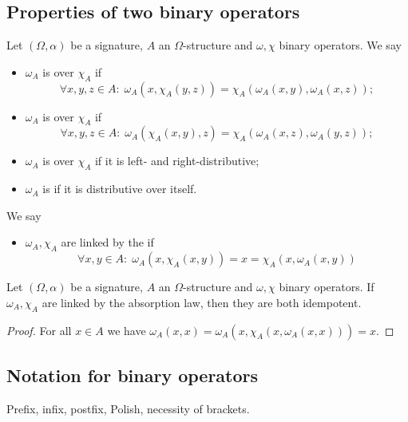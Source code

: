 \subsection{Properties of two binary operators}
\begin{definition}
Let $(\Omega, \alpha)$ be a signature, $A$ an $\Omega$-structure and $\omega, \chi$ binary operators. We say
\begin{itemize}
\item $\omega_A$ is  over $\chi_A$ if
\[ \forall x,y,z\in A: \; \omega_A(x,\chi_A(y,z)) = \chi_A(\omega_A(x,y),\omega_A(x,z)); \]
\item $\omega_A$ is  over $\chi_A$ if
\[ \forall x,y,z\in A: \; \omega_A(\chi_A(x,y), z) = \chi_A(\omega_A(x,z),\omega_A(y,z)); \]
\item $\omega_A$ is  over $\chi_A$ if it is left- and right-distributive;
\item $\omega_A$ is  if it is distributive over itself.
\end{itemize}
We say
\begin{itemize}
\item $\omega_A, \chi_A$ are linked by the  if
\[ \forall x,y\in A:\; \omega_A(x,\chi_A(x,y)) = x = \chi_A(x,\omega_A(x,y)) \]
\end{itemize}
\end{definition}

\begin{lemma} \label{absorptionIdempotency}
Let $(\Omega, \alpha)$ be a signature, $A$ an $\Omega$-structure and $\omega, \chi$ binary operators. If $\omega_A, \chi_A$ are linked by the absorption law, then they are both idempotent.
\end{lemma}
\begin{proof}
For all $x\in A$ we have $\omega_A(x,x) = \omega_A(x,\chi_A(x,\omega_A(x,x))) = x$.
\end{proof}

\subsection{Notation for binary operators}
Prefix, infix, postfix, Polish, necessity of brackets.